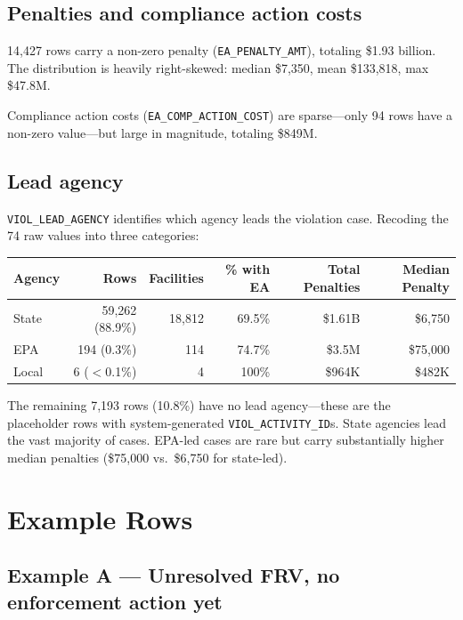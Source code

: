 \documentclass[11pt]{article}
\begin{document}
\subsection*{Penalties and compliance action costs}

14,427 rows carry a non-zero penalty (\texttt{EA\_PENALTY\_AMT}), totaling \$1.93 billion. The distribution is heavily right-skewed: median \$7,350, mean \$133,818, max \$47.8M.

Compliance action costs (\texttt{EA\_COMP\_ACTION\_COST}) are sparse---only 94 rows have a non-zero value---but large in magnitude, totaling \$849M.

\subsection*{Lead agency}

\texttt{VIOL\_LEAD\_AGENCY} identifies which agency leads the violation case. Recoding the 74 raw values into three categories:

\begin{table}[H]
\centering
\begin{tabular}{lrrrrr}
\toprule
Agency & Rows & Facilities & \% with EA & Total Penalties & Median Penalty \\
\midrule
State & 59,262 (88.9\%) & 18,812 & 69.5\% & \$1.61B & \$6,750 \\
EPA & 194 (0.3\%) & 114 & 74.7\% & \$3.5M & \$75,000 \\
Local & 6 ($<$0.1\%) & 4 & 100\% & \$964K & \$482K \\
\bottomrule
\end{tabular}
\end{table}

\noindent The remaining 7,193 rows (10.8\%) have no lead agency---these are the placeholder rows with system-generated \texttt{VIOL\_ACTIVITY\_ID}s. State agencies lead the vast majority of cases. EPA-led cases are rare but carry substantially higher median penalties (\$75,000 vs.\ \$6,750 for state-led).

\section{Example Rows}

\subsection*{Example A --- Unresolved FRV, no enforcement action yet}
\end{document}
